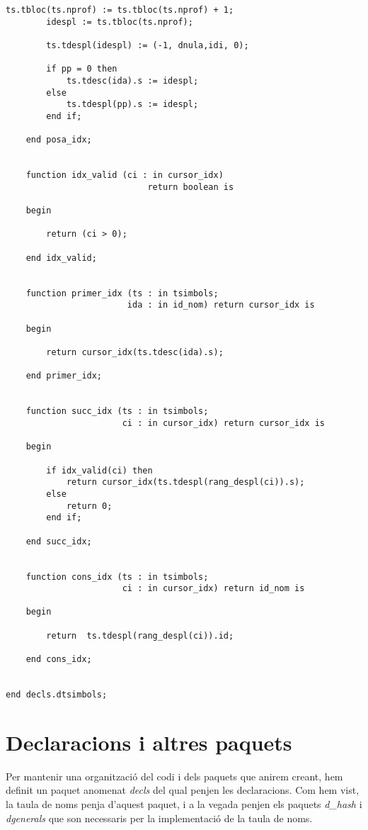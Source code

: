\documentclass[10pt]{report}
\begin{document}
\begin{lstlisting}[style=Ada]
        ts.tbloc(ts.nprof) := ts.tbloc(ts.nprof) + 1;
        idespl := ts.tbloc(ts.nprof);
        
        ts.tdespl(idespl) := (-1, dnula,idi, 0);
        
        if pp = 0 then
            ts.tdesc(ida).s := idespl;
        else
            ts.tdespl(pp).s := idespl;
        end if;        
    
    end posa_idx;
    
    
    function idx_valid (ci : in cursor_idx) 
                            return boolean is
    
    begin
    
        return (ci > 0);
    
    end idx_valid;
    
    
    function primer_idx (ts : in tsimbols;
                        ida : in id_nom) return cursor_idx is
    
    begin
    
        return cursor_idx(ts.tdesc(ida).s);
    
    end primer_idx;
    
    
    function succ_idx (ts : in tsimbols;
                       ci : in cursor_idx) return cursor_idx is
    
    begin
    
        if idx_valid(ci) then
            return cursor_idx(ts.tdespl(rang_despl(ci)).s);
        else 
            return 0;
        end if;
        
    end succ_idx;
    
    
    function cons_idx (ts : in tsimbols;
                       ci : in cursor_idx) return id_nom is
    
    begin
    
        return  ts.tdespl(rang_despl(ci)).id;
    
    end cons_idx;
    
    
end decls.dtsimbols;
    \end{lstlisting}
    \newpage
   
    
    
    \chapter{Declaracions i altres paquets}
        Per mantenir una organització del codi i dels paquets que anirem creant, hem definit un paquet anomenat \textit{decls} del qual penjen les declaracions. Com hem vist, la taula de noms penja d'aquest paquet, i a la vegada penjen els paquets \textit{d\_hash} i \textit{dgenerals} que son necessaris per la implementació de la taula de noms.
        \\
        
\end{document}
